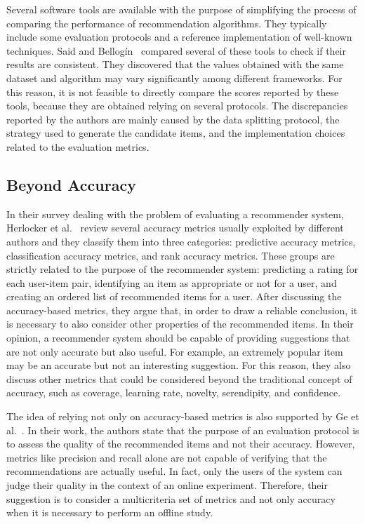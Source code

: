 Several software tools are available with the purpose of simplifying the process of comparing the performance of recommendation algorithms. They typically include some evaluation protocols and a reference implementation of well-known techniques. Said and Bellog\'in~\cite{Said2014} compared several of these tools to check if their results are consistent. They discovered that the values obtained with the same dataset and algorithm may vary significantly among different frameworks. For this reason, it is not feasible to directly compare the scores reported by these tools, because they are obtained relying on several protocols. The discrepancies reported by the authors are mainly caused by the data splitting protocol, the strategy used to generate the candidate items, and the implementation choices related to the evaluation metrics.

\subsection{Beyond Accuracy}
\label{soa:sec:beyond}

In their survey dealing with the problem of evaluating a recommender system, Herlocker et al.~\cite{Herlocker2004} review several accuracy metrics usually exploited by different authors and they classify them into three categories: predictive accuracy metrics, classification accuracy metrics, and rank accuracy metrics. These groups are strictly related to the purpose of the recommender system: predicting a rating for each user-item pair, identifying an item as appropriate or not for a user, and creating an ordered list of recommended items for a user. After discussing the accuracy-based metrics, they argue that, in order to draw a reliable conclusion, it is necessary to also consider other properties of the recommended items. In their opinion, a recommender system should be capable of providing suggestions that are not only accurate but also useful. For example, an extremely popular item may be an accurate but not an interesting suggestion. For this reason, they also discuss other metrics that could be considered beyond the traditional concept of accuracy, such as coverage, learning rate, novelty, serendipity, and confidence.

The idea of relying not only on accuracy-based metrics is also supported by Ge et al.~\cite{Ge2010}. In their work, the authors state that the purpose of an evaluation protocol is to assess the quality of the recommended items and not their accuracy. However, metrics like precision and recall alone are not capable of verifying that the recommendations are actually useful. In fact, only the users of the system can judge their quality in the context of an online experiment. Therefore, their suggestion is to consider a multicriteria set of metrics and not only accuracy when it is necessary to perform an offline study.

